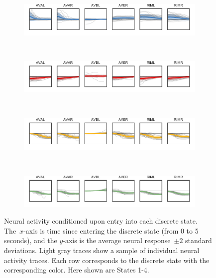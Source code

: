 \documentclass{article}
\begin{document}
\begin{figure}[t]
  \centering%
  \begin{subfigure}[b]{5.5in}
    \includegraphics[width=\textwidth]{neural_responses_subset_0.pdf}
  \end{subfigure} \\
  \begin{subfigure}[b]{5.5in}
    \includegraphics[width=\textwidth]{neural_responses_subset_1.pdf}
  \end{subfigure} \\
  \begin{subfigure}[b]{5.5in}
    \includegraphics[width=\textwidth]{neural_responses_subset_2.pdf}
  \end{subfigure}\\
  \begin{subfigure}[b]{5.5in}
    \includegraphics[width=\textwidth]{neural_responses_subset_3.pdf}
  \end{subfigure}
  \caption{Neural activity conditioned upon entry into each discrete
    state. The~$x$-axis is time since entering the discrete state
    (from 0 to 5 seconds), and the $y$-axis is the average neural
    response~$\pm 2$ standard deviations.  Light gray traces show a
    sample of individual neural activity traces.  Each row corresponds
    to the discrete state with the corresponding color. Here shown are
    States 1-4.}
  \label{fig:state_trigged_activity_1}
\end{figure}
\end{document}
